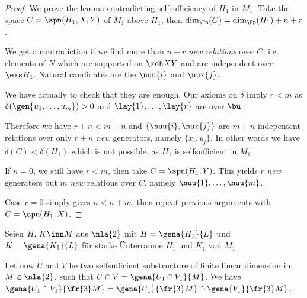 \begin{proof}
\medskip
We prove the lemma contradicting  selfsufficiency of $H_1$ in $M_1$.
Take the space $C=\spn(H_1,X,Y)$ of $M_{1}$ above $H_{1}$, then $\dim_{\Fp}(C)=\dim_{\Fp}(H_1)+n+r$.

We get a contradiction if we find more than $n+r$ \emph{new relations} over $C$, i.e. elements
of $N$ which are supported on $\xoh XY$ and are independent over $\exs H_{1}$.
Natural candidates are the $\nuu{i}$ and $\nux{j}$.

We have actually to check that they are enough. Our axioms on $\delta$ imply $r<m$ as $\delta(\gen{u_1,\dots,u_m})>0$ and $\lay{1},\dots,\lay{r}$ are over $\bu$.

Therefore we have $r+n<m+n$ and $\{\nuu{i},\nux{j}\}$ are $m+n$ indepentent relations over only $r+n$ \emph{new} generators, namely $\{x_{i},y_{j}\}$. In other words we have $\delta(C)<\delta(H_1)$ which is not possible,
as $H_{1}$ is selfsufficient in $M_{1}$.

If $n=0$, we still have $r<m$, then take $C=\spn(H_1,Y)$. This yields $r$ \emph{new} generators but $m$ \emph{new} relations over $C$, namely $\nuu{1},\dots,\nuu{m}$.  

Case $r=0$ simply gives $n<n+m$, then repeat previous arguments with $C=\spn(H_{1},X)$.
\end{proof}
\begin{lem}\label{bellemmino}
Seien $H,\,K\inn M$ aus $\nla{2}$ mit $H=\gena{H_{1}}{L}$ und $K=\gena{K_{1}}{L}$ f\"ur starke \"Unterraume $H_{1}$ und $K_{1}$ von $M_{1}$


Let now $U$ and $V$ be two selfsufficient substructure of finite linear dimension in $M\in\nla{2}$, such that $U\cap V=\gena{U_{1}\cap
V_{1}}{M}$.
We have %
$\gena{U_{1}\cap V_{1}}{\fr{3}M}=\gena{U_{1}}{\fr{3}M}\cap\gena{V_{1}}{\fr{3}M}$.
\end{lem}
